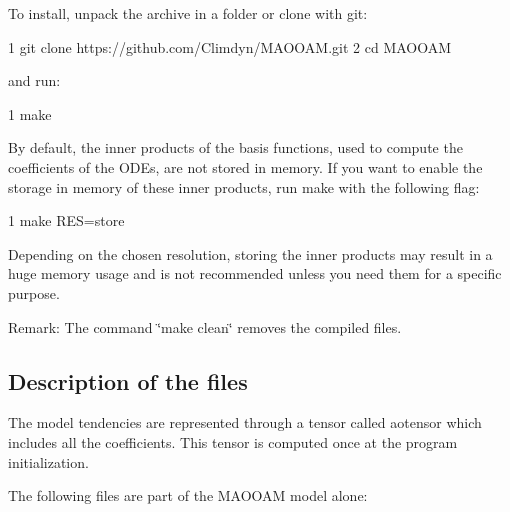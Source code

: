 To install, unpack the archive in a folder or clone with git\+:


\begin{DoxyCode}
1 git clone https://github.com/Climdyn/MAOOAM.git
2 cd MAOOAM
\end{DoxyCode}


and run\+:


\begin{DoxyCode}
1 make
\end{DoxyCode}
 By default, the inner products of the basis functions, used to compute the coefficients of the O\+D\+Es, are not stored in memory. If you want to enable the storage in memory of these inner products, run make with the following flag\+:


\begin{DoxyCode}
1 make RES=store
\end{DoxyCode}


Depending on the chosen resolution, storing the inner products may result in a huge memory usage and is not recommended unless you need them for a specific purpose.

Remark\+: The command \char`\"{}make clean\char`\"{} removes the compiled files. 



\subsection*{Description of the files}

The model tendencies are represented through a tensor called aotensor which includes all the coefficients. This tensor is computed once at the program initialization.

The following files are part of the M\+A\+O\+O\+AM model alone\+:



